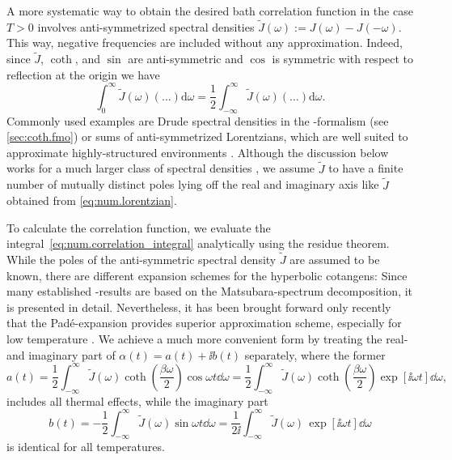 A more systematic way to obtain the desired bath correlation function in the case $T > 0$ involves anti-symmetrized spectral densities $\tilde J(\omega) := J(\omega) - J(-\omega)$.
This way, negative frequencies are included without any approximation.
Indeed, since $\tilde J$, $\coth$, and $\sin$ are anti-symmetric and $\cos$ is symmetric with respect to reflection at the origin we have
\begin{equation}
  \int_0^\infty \tilde J(\omega) (\dots) \mathrm{d}\omega = \frac{1}{2}\int_{-\infty}^\infty \tilde J(\omega) (\dots) \mathrm{d}\omega.
  \label{eq:num.correlation_integral}
\end{equation}
Commonly used examples are Drude spectral densities in the \HEOM-formalism (see \autoref{sec:coth.fmo}) or sums of anti-symmetrized Lorentzians, which are well suited to approximate highly-structured environments \cite{MeTa99_non_markovian}.
Although the discussion below works for a much larger class of spectral densities \cite{RiEi13_bcf}, we assume $\tilde J$ to have a finite number of mutually distinct poles lying off the real and imaginary axis like $\tilde J$ obtained from \autoref{eq:num.lorentzian}.

To calculate the correlation function, we evaluate the integral~\ref{eq:num.correlation_integral} analytically using the residue theorem.
While the poles of the anti-symmetric spectral density $\tilde J$ are assumed to be known, there are different expansion schemes for the hyperbolic cotangens:
Since many established \HEOM-results are based on the Matsubara-spectrum decomposition, it is presented in detail.
Nevertheless, it has been brought forward only recently that the Padé-expansion provides superior approximation scheme, especially for low temperature \cite{HuXuYa10_pade,Hu11_pade}.
We achieve a much more convenient form by treating the real- and imaginary part of $\alpha(t) = a(t) + \ii b(t)$ separately, where the former
\begin{equation}
  a(t) = \frac{1}{2} \int_{-\infty}^\infty \tilde J(\omega) \coth \left( \frac{\beta\omega}{2} \right) \cos \omega t \dd\omega
  = \frac{1}{2} \int_{-\infty}^\infty \tilde J(\omega) \coth \left( \frac{\beta\omega}{2} \right) \exp[\ii \omega t] \dd\omega,
  \label{eq:num.alpha_thermal_re}
\end{equation}
includes all thermal effects, while the imaginary part
\begin{equation*}
  b(t) = - \frac{1}{2} \int_{-\infty}^\infty \tilde J(\omega) \sin \omega t \dd \omega
  = \frac{1}{2\ii}\int_{-\infty}^\infty \tilde J(\omega) \, \exp[\ii\omega t] \dd\omega
\end{equation*}
is identical for all temperatures.\\




